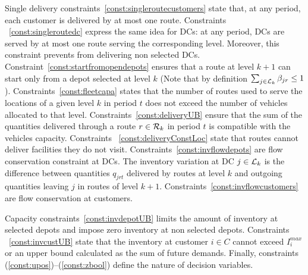 \documentclass[a4paper,10pt]{article}
\begin{document}
\begin{linenumbers}
Single delivery constraints~\eqref{const:singleroutecustomers} state that, at any period, each customer is delivered by at most one route. 
%
Constraints ~\eqref{const:singleroutedc} express the same idea for DCs: at any period, DCs are served by at most one route serving the corresponding level. Moreover, this constraint prevents from delivering non selected DCs. 
%
Constraint~\eqref{const:startfromopendepots} ensures that a route at level $k+1$ can start only from a depot selected at level $k$ (Note that by definition $\sum_{j\in\mathcal{L}_{k}} \beta_{jr} \leq 1$).
%
Constraints~\eqref{const:fleetcapa} states that the number of routes used to serve the locations of a given level $k$ in period $t$ does not exceed the number of vehicles allocated to that level. 
%
Constraints~\eqref{const:deliveryUB} ensure that the sum of the quantities delivered through a route $r\in\mathcal{R}_k$ in period $t$ is compatible with the vehicles capacity. 
%
Constraints ~\eqref{const:deliveryConstLoc}  state that routes cannot deliver facilities they do not visit. 
%
Constraints~\eqref{const:invflowdepots} are flow conservation constraint at DCs. 
The inventory variation at DC $j \in \mathcal{L}_k$ is the difference between quantities $q_{jrt}$ delivered by routes at level $k$ and outgoing quantities leaving $j$ in routes of level $k+1$. 
%
Constraints~\eqref{const:invflowcustomers} are flow conservation at customers.

%
Capacity constraints~\eqref{const:invdepotUB} limits the amount of inventory at selected depots and impose zero inventory at non selected depots. 
%
Constraints ~\eqref{const:invcustUB} state that the inventory at customer $i \in C$ cannot exceed $I_i^{max}$ or an upper bound calculated as the sum of future demands. 
%
Finally, constraints (\ref{const:upos})--(\ref{const:zbool}) define the nature of decision variables. 





\end{linenumbers}
\end{document}
